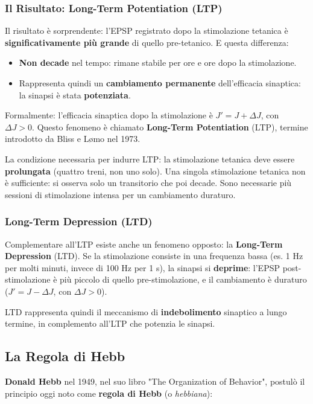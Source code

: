 \subsubsection{Il Risultato: Long-Term Potentiation (LTP)}

Il risultato è sorprendente: l'EPSP registrato dopo la stimolazione tetanica è \textbf{significativamente più grande} di quello pre-tetanico. E questa differenza:
\begin{itemize}
    \item \textbf{Non decade} nel tempo: rimane stabile per ore e ore dopo la stimolazione.
    \item Rappresenta quindi un \textbf{cambiamento permanente} dell'efficacia sinaptica: la sinapsi è stata \textbf{potenziata}.
\end{itemize}

Formalmente: l'efficacia sinaptica dopo la stimolazione è $J' = J + \Delta J$, con $\Delta J > 0$. Questo fenomeno è chiamato \textbf{Long-Term Potentiation} (LTP), termine introdotto da Bliss e Lømo nel 1973.

La condizione necessaria per indurre LTP: la stimolazione tetanica deve essere \textbf{prolungata} (quattro treni, non uno solo). Una singola stimolazione tetanica non è sufficiente: si osserva solo un transitorio che poi decade. Sono necessarie più sessioni di stimolazione intensa per un cambiamento duraturo.


\subsubsection{Long-Term Depression (LTD)}

Complementare all'LTP esiste anche un fenomeno opposto: la \textbf{Long-Term Depression} (LTD). Se la stimolazione consiste in una frequenza bassa (es. 1 Hz per molti minuti, invece di 100 Hz per 1 s), la sinapsi si \textbf{deprime}: l'EPSP post-stimolazione è più piccolo di quello pre-stimolazione, e il cambiamento è duraturo ($J' = J - \Delta J$, con $\Delta J > 0$).

LTD rappresenta quindi il meccanismo di \textbf{indebolimento} sinaptico a lungo termine, in complemento all'LTP che potenzia le sinapsi.

\subsection{La Regola di Hebb}

\textbf{Donald Hebb} nel 1949, nel suo libro "The Organization of Behavior", postulò il principio oggi noto come \textbf{regola di Hebb} (o \textit{hebbiana}):

